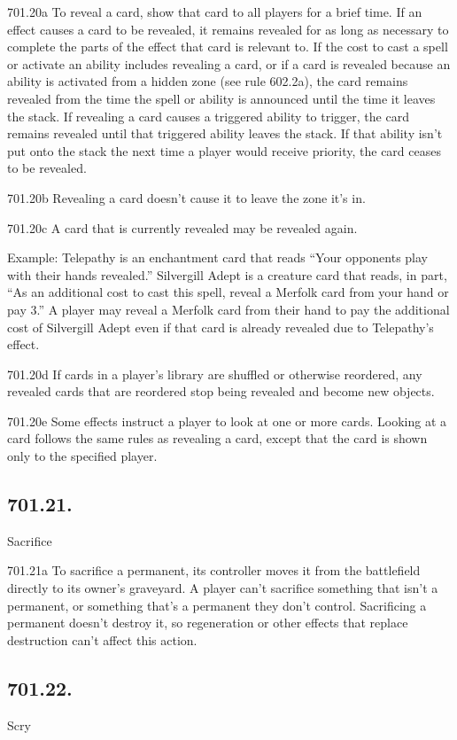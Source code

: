 701.20a To reveal a card, show that card to all players for a brief time. If an effect causes a card to be revealed, it remains revealed for as long as necessary to complete the parts of the effect that card is relevant to. If the cost to cast a spell or activate an ability includes revealing a card, or if a card is revealed because an ability is activated from a hidden zone (see rule 602.2a), the card remains revealed from the time the spell or ability is announced until the time it leaves the stack. If revealing a card causes a triggered ability to trigger, the card remains revealed until that triggered ability leaves the stack. If that ability isn’t put onto the stack the next time a player would receive priority, the card ceases to be revealed.

701.20b Revealing a card doesn’t cause it to leave the zone it’s in.

701.20c A card that is currently revealed may be revealed again.

Example: Telepathy is an enchantment card that reads “Your opponents play with their hands revealed.” Silvergill Adept is a creature card that reads, in part, “As an additional cost to cast this spell, reveal a Merfolk card from your hand or pay {3}.” A player may reveal a Merfolk card from their hand to pay the additional cost of Silvergill Adept even if that card is already revealed due to Telepathy’s effect.

701.20d If cards in a player’s library are shuffled or otherwise reordered, any revealed cards that are reordered stop being revealed and become new objects.

701.20e Some effects instruct a player to look at one or more cards. Looking at a card follows the same rules as revealing a card, except that the card is shown only to the specified player.

\subsection*{701.21.}
Sacrifice

701.21a To sacrifice a permanent, its controller moves it from the battlefield directly to its owner’s graveyard. A player can’t sacrifice something that isn’t a permanent, or something that’s a permanent they don’t control. Sacrificing a permanent doesn’t destroy it, so regeneration or other effects that replace destruction can’t affect this action.

\subsection*{701.22.}
Scry

